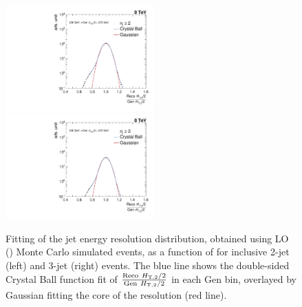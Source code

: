 \begin{figure}[!h]
 \begin{center}
 \hspace*{-5mm}\includegraphics[width=0.51\textwidth]{Plots_HT_2_150/Fit_Res_2_final_crystal_genbin_250-275_crystal_nomet.pdf}%
 ~~\includegraphics[width=0.51\textwidth]{Plots_HT_2_150/Fit_Res_3_final_crystal_genbin_250-275_crystal_nomet.pdf}
 \caption[Fitting of the jet energy resolution distribution as a function of \httwo.]{Fitting of the jet energy resolution distribution, obtained using LO \MadGraphFn\plusn \PYTHIAS (\MGP) Monte Carlo simulated events, as a function of \httwo for inclusive 2-jet (left) and 3-jet (right) events. The blue line shows the double-sided Crystal Ball function fit of $\frac{{\rm Reco}~\httwo}{{\rm Gen}~\httwo}$ in each Gen \httwo bin, overlayed by Gaussian fitting the core of the resolution (red line).}
 \label{fig:fit_gauss}
 \end{center}
\end{figure}

